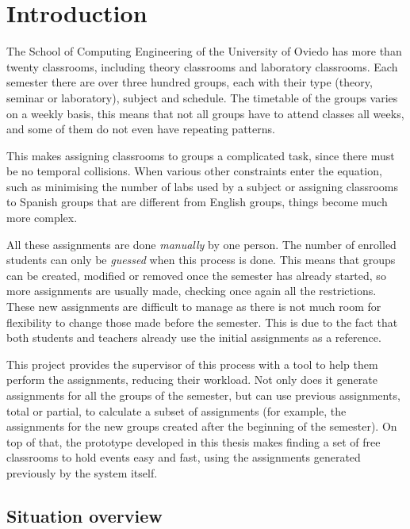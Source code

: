 \renewcommand{\documentname}{Introduction}

\chapter{Introduction}


The School of Computing Engineering of the University of Oviedo has more than twenty classrooms, including theory classrooms and laboratory classrooms. Each semester there are over three hundred groups, each with their type (theory, seminar or laboratory), subject and schedule. The timetable of the groups varies on a weekly basis, this means that not all groups have to attend classes all weeks, and some of them do not even have repeating patterns.

This makes assigning classrooms to groups a complicated task, since there must be no temporal collisions. When various other constraints enter the equation, such as minimising the number of labs used by a subject or assigning classrooms to Spanish groups that are different from English groups, things become much more complex.

All these assignments are done \textit{manually} by one person. The number of enrolled students can only be \textit{guessed} when this process is done. This means that groups can be created, modified or removed once the semester has already started, so more assignments are usually made, checking once again all the restrictions. These new assignments are difficult to manage as there is not much room for flexibility to change those made before the semester. This is due to the fact that both students and teachers already use the initial assignments as a reference.

This project provides the supervisor of this process with a tool to help them perform the assignments, reducing their workload. Not only does it generate assignments for all the groups of the semester, but can use previous assignments, total or partial, to calculate a subset of assignments (for example, the assignments for the new groups created after the beginning of the semester). On top of that, the prototype developed in this thesis makes finding a set of free classrooms to hold events easy and fast, using the assignments generated previously by the system itself.


\section{Situation overview}

